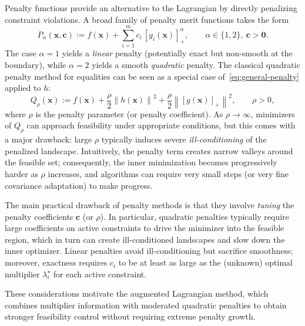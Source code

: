 \documentclass[11pt,a4paper]{article}
\numberwithin{equation}{section}
\numberwithin{figure}{section}
\numberwithin{table}{section}
\theoremstyle{definition}
\newcommand{\norm}[1]{\left\lVert #1 \right\rVert}
\newcommand{\pos}[1]{\left[#1\right]_+}
\begin{document}
Penalty functions provide an alternative to the Lagrangian by directly penalizing constraint violations. A broad family of penalty merit functions takes the form\cite{DufosseHansen}
\begin{equation}
\label{eq:general-penalty}
  P_\alpha(\bm{x},\bm{c})
  := f(\bm{x}) + \sum_{i=1}^m c_i\,\pos{g_i(\bm{x})}^{\alpha},
  \qquad \alpha\in\{1,2\},\ \bm{c}>\bm{0}.
\end{equation}
The case $\alpha=1$ yields a \emph{linear} penalty (potentially exact but non-smooth at the boundary), while $\alpha=2$ yields a smooth \emph{quadratic} penalty.
The classical quadratic penalty method for equalities can be seen as a special case of~\eqref{eq:general-penalty} applied to $h$:
\begin{equation}
\label{eq:quadratic-penalty}
  Q_\rho(\bm{x})
  := f(\bm{x})
  + \frac{\rho}{2}\norm{h(\bm{x})}^2
  + \frac{\rho}{2}\norm{\pos{g(\bm{x})}}^2,
  \qquad \rho>0,
\end{equation}
where $\rho$ is the penalty parameter (or penalty coefficient). As $\rho\to\infty$, minimizers of $Q_\rho$ can approach feasibility under appropriate conditions, but this comes with a major drawback: large $\rho$ typically induces severe \emph{ill-conditioning} of the penalized landscape.\cite{NocedalWright} Intuitively, the penalty term creates narrow valleys around the feasible set; consequently, the inner minimization becomes progressively harder as $\rho$ increases, and algorithms can require very small steps (or very fine covariance adaptation) to make progress.

The main practical drawback of penalty methods is that they involve \emph{tuning} the penalty coefficients $\bm{c}$ (or $\rho$). In particular, quadratic penalties typically require large coefficients on active constraints to drive the minimizer into the feasible region, which in turn can create ill-conditioned landscapes and slow down the inner optimizer.\cite{NocedalWright,DufosseHansen} Linear penalties avoid ill-conditioning but sacrifice smoothness; moreover, exactness requires $c_i$ to be at least as large as the (unknown) optimal multiplier $\lambda_i^\star$ for each active constraint.\cite{DufosseHansen}

These considerations motivate the augmented Lagrangian method, which combines multiplier information with moderated quadratic penalties to obtain stronger feasibility control without requiring extreme penalty growth.\cite{NocedalWright}
\end{document}
